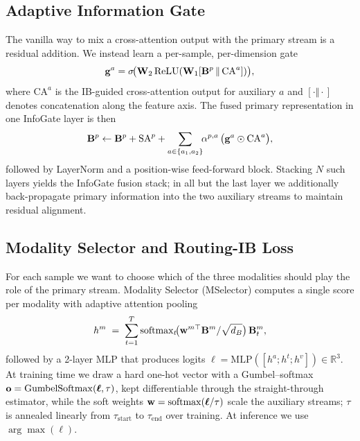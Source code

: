 \subsection{Adaptive Information Gate}
\label{sec:method:gate}

The vanilla way to mix a cross-attention output with the primary stream
is a residual addition.
We instead learn a per-sample, per-dimension gate
\begin{equation}
  \mathbf{g}^{a} = \sigma\!\big(\mathbf{W}_{2}\,\mathrm{ReLU}(\mathbf{W}_{1}[\mathbf{B}^{p}\,\Vert\,\mathrm{CA}^{a}])\big),
  \label{eq:adagate}
\end{equation}
where $\mathrm{CA}^{a}$ is the IB-guided cross-attention output for
auxiliary $a$ and $[\cdot\Vert\cdot]$ denotes concatenation along the
feature axis.
The fused primary representation in one InfoGate layer is then
\begin{equation}
  \mathbf{B}^{p} \leftarrow \mathbf{B}^{p}+\mathrm{SA}^{p}+\sum_{a\in\{a_{1},a_{2}\}}\!\!\alpha^{p,a}\,\big(\mathbf{g}^{a}\odot\mathrm{CA}^{a}\big),
  \label{eq:layer_update}
\end{equation}
followed by LayerNorm and a position-wise feed-forward block.
Stacking $N$ such layers yields the InfoGate fusion stack; in all but
the last layer we additionally back-propagate primary information into
the two auxiliary streams to maintain residual alignment.

\subsection{Modality Selector and Routing-IB Loss}
\label{sec:method:mselector}

For each sample we want to choose which of the three modalities should
play the role of the primary stream.
Modality Selector (MSelector) computes a single score per modality with
adaptive attention pooling
\begin{equation}
  h^{m} \;=\; \sum_{t=1}^{T}\mathrm{softmax}_{t}\!\big(\mathbf{w}^{m\top}\mathbf{B}^{m}/\sqrt{d_{B}}\big)\,\mathbf{B}^{m}_{t},
\end{equation}
followed by a 2-layer MLP that produces logits
$\boldsymbol{\ell}=\mathrm{MLP}([h^{a};h^{t};h^{v}])\in\mathbb{R}^{3}$.
At training time we draw a hard one-hot vector with a Gumbel--softmax
\citep{jang2017gumbel,maddison2017concrete}
$\mathbf{o}=\mathrm{GumbelSoftmax}(\boldsymbol{\ell},\tau)$, kept
differentiable through the straight-through estimator, while the soft
weights $\mathbf{w}=\mathrm{softmax}(\boldsymbol{\ell}/\tau)$ scale the auxiliary
streams; $\tau$ is annealed linearly from $\tau_{\text{start}}$ to
$\tau_{\text{end}}$ over training.
At inference we use $\arg\max(\boldsymbol{\ell})$.


